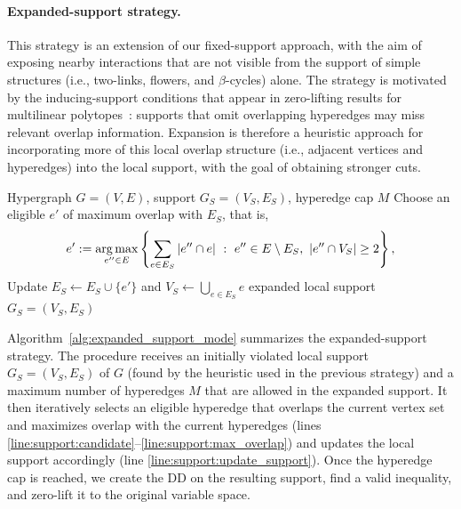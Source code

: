\paragraph{Expanded-support strategy.} This strategy is an extension of our fixed-support approach, with the aim of exposing nearby interactions that are not visible from the support of simple structures (i.e., two-links, flowers, and $\beta$-cycles) alone. The strategy is motivated by the inducing-support conditions that appear in zero-lifting results for multilinear polytopes~\cite{del2017polyhedral}: supports that omit overlapping hyperedges may miss relevant overlap information. Expansion is therefore a heuristic approach for incorporating more of this local overlap structure (i.e., adjacent vertices and hyperedges) into the local support, with the goal of obtaining stronger cuts.

\begin{algorithm}[t]
\caption{\textsc{ExpandedSupportStrategy}}
\label{alg:expanded_support_mode}
\begin{algorithmic}[1]
\Require Hypergraph $G=(V,E)$, support $G_S=(V_S, E_S)$, hyperedge cap $M$
 \label{line:support:candidate}
    \State Choose an eligible $e'$ of maximum overlap with $E_S$, that is,  
    \[
    e' :=\argmax_{e'' \in E}
    \left\{\sum_{e\in E_S}|e''\cap e| \ :\ e'' \in E\setminus E_S,\ |e''\cap V_S|\ge 2  \right\},
    \] \label{line:support:max_overlap}
    \State Update $E_S \gets E_S \cup \{e'\}$ and $V_S\gets \bigcup_{e\in E_S} e$\label{line:support:update_support}
\EndWhile
\State \Return expanded local support $G_S=(V_S, E_S)$ 
\end{algorithmic}
\end{algorithm}

Algorithm~\ref{alg:expanded_support_mode} summarizes the expanded-support strategy. The procedure receives an initially violated local support $G_S=(V_S, E_S)$ of $G$ (found by the heuristic used in the previous strategy) and a maximum number of hyperedges $M$ that are allowed in the expanded support. It then iteratively selects an eligible hyperedge that overlaps the current vertex set and maximizes overlap with the current hyperedges (lines \ref{line:support:candidate}--\ref{line:support:max_overlap})
and updates the local support accordingly (line \ref{line:support:update_support}). 
Once the hyperedge cap is reached, we create the DD on the resulting support, find a valid inequality, and zero-lift it to the original variable space.

